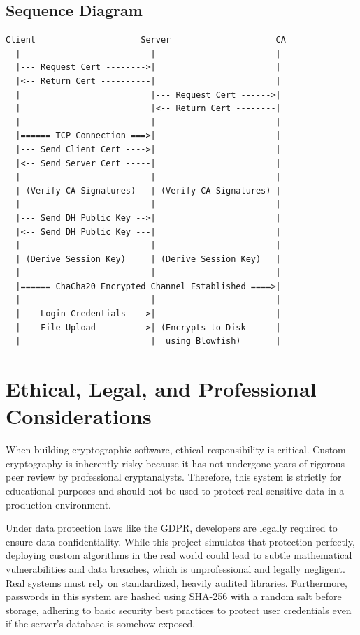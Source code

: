 \documentclass[12pt,a4paper]{article}
\begin{document}
\subsection{Sequence Diagram}
\begin{verbatim}
Client                     Server                     CA
  |                          |                        |
  |--- Request Cert -------->|                        |
  |<-- Return Cert ----------|                        |
  |                          |--- Request Cert ------>|
  |                          |<-- Return Cert --------|
  |                          |                        |
  |====== TCP Connection ===>|                        |
  |--- Send Client Cert ---->|                        |
  |<-- Send Server Cert -----|                        |
  |                          |                        |
  | (Verify CA Signatures)   | (Verify CA Signatures) |
  |                          |                        |
  |--- Send DH Public Key -->|                        |
  |<-- Send DH Public Key ---|                        |
  |                          |                        |
  | (Derive Session Key)     | (Derive Session Key)   |
  |                          |                        |
  |====== ChaCha20 Encrypted Channel Established ====>|
  |                          |                        |
  |--- Login Credentials --->|                        |
  |--- File Upload --------->| (Encrypts to Disk      |
  |                          |  using Blowfish)       |
\end{verbatim}

\section{Ethical, Legal, and Professional Considerations}
When building cryptographic software, ethical responsibility is critical. Custom cryptography is inherently risky because it has not undergone years of rigorous peer review by professional cryptanalysts. Therefore, this system is strictly for educational purposes and should not be used to protect real sensitive data in a production environment. 

Under data protection laws like the GDPR, developers are legally required to ensure data confidentiality. While this project simulates that protection perfectly, deploying custom algorithms in the real world could lead to subtle mathematical vulnerabilities and data breaches, which is unprofessional and legally negligent. Real systems must rely on standardized, heavily audited libraries. Furthermore, passwords in this system are hashed using SHA-256 with a random salt before storage, adhering to basic security best practices to protect user credentials even if the server's database is somehow exposed.
\end{document}
